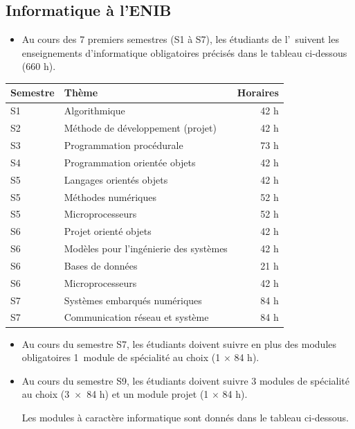 \subsection{Informatique à l'ENIB}\label{annexe:enib}

\begin{itemize}
\item Au cours des 7 premiers semestres (S1 à S7), les étudiants de l'\enib\ 
suivent les enseignements d'informatique obligatoires 
précisés dans le tableau ci-dessous (660 h).
\end{itemize}

\begin{longtable}{llr}
\hline
Semestre & Thème & Horaires \\
\hline
S1  & Algorithmique                 			& 42 h \\
\hline
S2  & Méthode de développement (projet)     	& 42 h \\
\hline
S3  & Programmation procédurale     			& 73 h \\
\hline
S4  & Programmation orientée objets      		& 42 h \\
\hline
S5  & Langages orientés objets               	& 42 h \\
S5  & Méthodes numériques						& 52 h \\
S5  & Microprocesseurs							& 52 h \\
\hline
S6  & Projet orienté objets			        	& 42 h \\
S6  & Modèles pour l'ingénierie des systèmes 	& 42 h \\
S6  & Bases de données                       	& 21 h\\
S6  & Microprocesseurs							& 42 h \\
\hline
S7	& Systèmes embarqués numériques				& 84 h \\
S7	& Communication réseau et système			& 84 h \\
\hline
\end{longtable}

\begin{itemize}
\item Au cours du semestre S7, les étudiants doivent suivre en plus des modules obligatoires
1~module de spécialité au choix (1 $\times$ 84 h).
\item Au cours du semestre S9,
les étudiants doivent suivre 3 modules de spécialité au choix (3~$\times$~84 h)
et un module projet (1 $\times$ 84 h).

Les modules à caractère informatique sont donnés dans le tableau ci-dessous.
\end{itemize}

